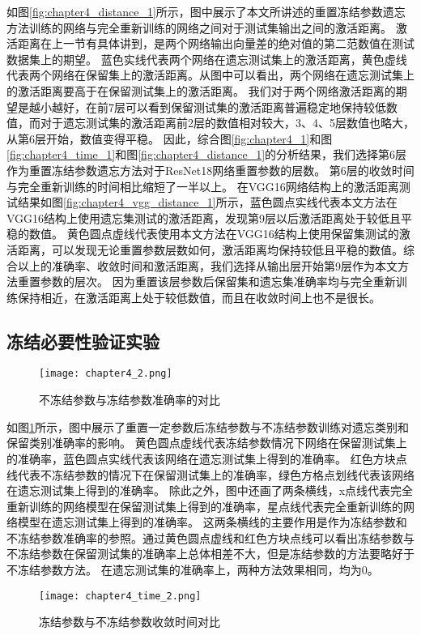 如图\ref{fig:chapter4_distance_1}所示，图中展示了本文所讲述的重置冻结参数遗忘方法训练的网络与完全重新训练的网络之间对于测试集输出之间的激活距离。
激活距离在上一节有具体讲到，是两个网络输出向量差的绝对值的第二范数值在测试数据集上的期望。
蓝色实线代表两个网络在遗忘测试集上的激活距离，黄色虚线代表两个网络在保留集上的激活距离。从图中可以看出，两个网络在遗忘测试集上的激活距离要高于在保留测试集上的激活距离。
我们对于两个网络激活距离的期望是越小越好，在前7层可以看到保留测试集的激活距离普遍稳定地保持较低数值，而对于遗忘测试集的激活距离前2层的数值相对较大，3、4、5层数值也略大，从第6层开始，数值变得平稳。
因此，综合图\ref{fig:chapter4_1}和图\ref{fig:chapter4_time_1}和图\ref{fig:chapter4_distance_1}的分析结果，我们选择第6层作为重置冻结参数遗忘方法对于ResNet18网络重置参数的层数。
第6层的收敛时间与完全重新训练的时间相比缩短了一半以上。
在VGG16网络结构上的激活距离测试结果如图\ref{fig:chapter4_vgg_distance_1}所示，蓝色圆点实线代表本文方法在VGG16结构上使用遗忘集测试的激活距离，发现第9层以后激活距离处于较低且平稳的数值。
黄色圆点虚线代表使用本文方法在VGG16结构上使用保留集测试的激活距离，可以发现无论重置参数层数如何，激活距离均保持较低且平稳的数值。综合以上的准确率、收敛时间和激活距离，我们选择从输出层开始第9层作为本文方法重置参数的层次。
因为重置该层参数后保留集和遗忘集准确率均与完全重新训练保持相近，在激活距离上处于较低数值，而且在收敛时间上也不是很长。

\subsection{冻结必要性验证实验}
\begin{figure}
    \centering
    \texttt{[image: chapter4\_2.png]}
    \caption{不冻结参数与冻结参数准确率的对比}
    \label{fig:chapter4_2}
\end{figure}

如图\ref{fig:chapter4_2}所示，图中展示了重置一定参数后冻结参数与不冻结参数训练对遗忘类别和保留类别准确率的影响。
黄色圆点虚线代表冻结参数情况下网络在保留测试集上的准确率，蓝色圆点实线代表该网络在遗忘测试集上得到的准确率。
红色方块点线代表不冻结参数的情况下在保留测试集上的准确率，绿色方格点划线代表该网络在遗忘测试集上得到的准确率。
除此之外，图中还画了两条横线，x点线代表完全重新训练的网络模型在保留测试集上得到的准确率，星点线代表完全重新训练的网络模型在遗忘测试集上得到的准确率。
这两条横线的主要作用是作为冻结参数和不冻结参数准确率的参照。通过黄色圆点虚线和红色方块点线可以看出冻结参数与不冻结参数在保留测试集的准确率上总体相差不大，但是冻结参数的方法要略好于不冻结参数方法。
在遗忘测试集的准确率上，两种方法效果相同，均为0。
\begin{figure}
    \centering
    \texttt{[image: chapter4\_time\_2.png]}
    \caption{冻结参数与不冻结参数收敛时间对比}
    \label{fig:chapter4_time_2}
\end{figure}

